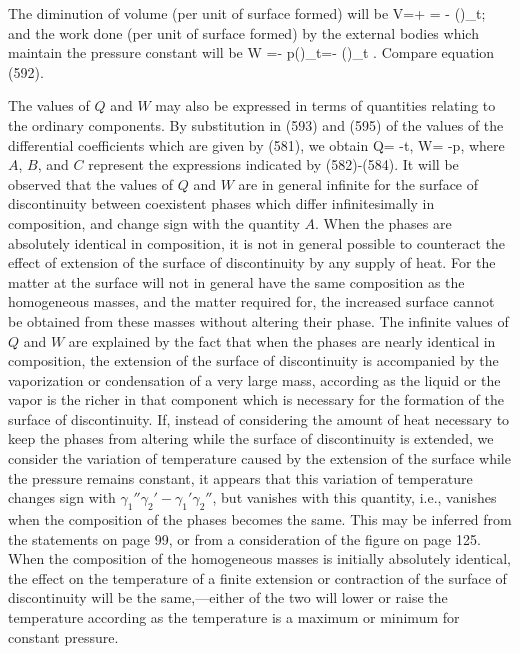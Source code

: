 \documentclass[12pt]{article}
\begin{document}
{The diminution of volume (per unit of surface formed) will be
\eqs V=+ = - \left(\right)_t;  \label{594} \eqe
and the work done (per unit of surface formed) by the external
bodies which maintain the pressure constant will be
\eqs W =- p\left(\right)_t=- \left(\right)_t . \label{595} \eqe
Compare equation (592).

The values of $Q$ and $W$ may also be expressed in terms of quantities relating to the ordinary components. By substitution in (593) and (595) of the values of the differential coefficients which are given by (581), we obtain
\eqs Q= -t,  \quad  W= -p,  \label{596} \eqe
where $A$, $B$, and $C$ represent the expressions indicated by (582)-(584). It will be observed that the values of $Q$ and $W$ are in general infinite for the surface of discontinuity between coexistent phases which differ infinitesimally in composition, and change sign with the quantity $A$. When the phases are absolutely identical in composition, it is not in general possible to counteract the effect of extension of the surface of discontinuity by any supply of heat. For the matter at the surface will not in general have the same composition as the homogeneous masses, and the matter required for, the increased surface cannot be obtained from these masses without altering their phase. The infinite values of $Q$ and $W$ are explained by the fact that when the phases are nearly identical in composition, the extension of the surface of discontinuity is accompanied by the vaporization or condensation of a very large mass, according as the liquid or the vapor is the richer in that component which is necessary for the formation of the surface of discontinuity.
If, instead of considering the amount of heat necessary to keep the phases from altering while the surface of discontinuity is extended, we consider the variation of temperature caused by the extension of the surface while the pressure remains constant, it appears that this variation  of temperature changes sign with $\gamma_1''\gamma_2'- \gamma_1'\gamma_2''$, but vanishes with this quantity, i.e., vanishes when the composition of the phases becomes the same. This may be inferred from the statements on page 99, or from a consideration of the figure on page 125. When the composition of the homogeneous masses is initially absolutely identical, the effect on the temperature of a finite extension or contraction of the surface of discontinuity will be the same,---either of the two will lower or raise the temperature according as the temperature is a maximum or minimum for constant pressure.



}
\end{document}
